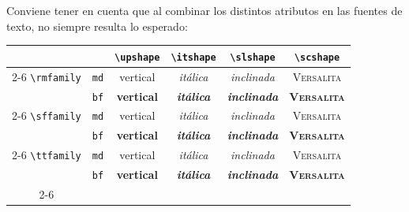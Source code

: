 Conviene tener en cuenta que al combinar los distintos atributos en las fuentes
de texto, no siempre resulta lo esperado:
\begin{center}
\begin{tabular}{cccccc}
      &    &\small\verb;\upshape; & \small\verb;\itshape;
           &\small\verb;\slshape; & \small\verb;\scshape;\\
\cline{2-6}
\small\verb;\rmfamily; & \small\verb;md; &
  \rmfamily\mdseries\textup{vertical} &
  \rmfamily\mdseries\textit{it\'alica}&
  \rmfamily\mdseries\textsl{inclinada}&
  \rmfamily\mdseries\textsc{Versalita}\\
      & \small\verb;bf; &
  \rmfamily\bfseries\textup{vertical} &
  \rmfamily\bfseries\textit{it\'alica}&
  \rmfamily\bfseries\textsl{inclinada}&
  \rmfamily\bfseries\textsc{Versalita}\\
\cline{2-6}
\small\verb;\sffamily; & \small\verb;md; &
  \sffamily\mdseries\textup{vertical} &
  \sffamily\mdseries\textit{it\'alica}&
  \sffamily\mdseries\textsl{inclinada}&
  \sffamily\mdseries\textsc{Versalita}\\
      & \small\verb;bf; &
  \sffamily\bfseries\textup{vertical} &
  \sffamily\bfseries\textit{it\'alica}&
  \sffamily\bfseries\textsl{inclinada}&
  \sffamily\bfseries\textsc{Versalita}\\
\cline{2-6}
\small\verb;\ttfamily; & \small\verb;md; &
  \ttfamily\mdseries\textup{vertical} &
  \ttfamily\mdseries\textit{it\'alica}&
  \ttfamily\mdseries\textsl{inclinada}&
  \ttfamily\mdseries\textsc{Versalita}\\
      & \small\verb;bf; &
  \ttfamily\bfseries\textup{vertical} &
  \ttfamily\bfseries\textit{it\'alica}&
  \ttfamily\bfseries\textsl{inclinada}&
  \ttfamily\bfseries\textsc{Versalita}\\
\cline{2-6}
\end{tabular}
\end{center}

